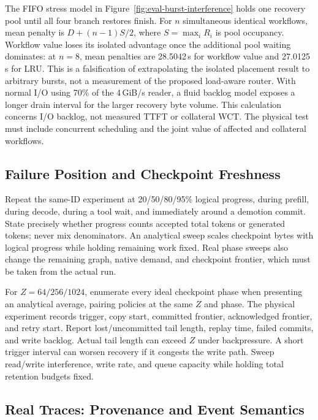 \documentclass[sigplan,10pt,anonymous,nonacm]{acmart}
\begin{document}
The FIFO stress model in Figure~\ref{fig:eval-burst-interference} holds
one recovery pool until all four branch restores finish. For $n$
simultaneous identical workflows, mean penalty is
$D+(n-1)S/2$, where $S=\max_i R_i$ is pool occupancy. Workflow value
loses its isolated advantage once the additional pool waiting dominates:
at $n=8$, mean penalties are 28.5042\,s for workflow value and
27.0125\,s for LRU. This is a falsification of extrapolating the
isolated placement result to arbitrary bursts, not a measurement of the
proposed load-aware router. With normal I/O using 70\% of the 4\,GiB/s reader, a fluid backlog model exposes a longer drain interval for the larger recovery byte volume. This calculation concerns I/O backlog, not measured TTFT or collateral WCT. The physical test must include concurrent scheduling and
the joint value of affected and collateral workflows.

\FloatBarrier
\subsection{Failure Position and Checkpoint Freshness}

Repeat the same-ID experiment at 20/50/80/95\% logical progress, during
prefill, during decode, during a tool wait, and immediately around a
demotion commit. State precisely whether progress counts accepted total
tokens or generated tokens; never mix denominators. An analytical sweep scales checkpoint bytes with logical progress while holding remaining work fixed.
Real phase sweeps also change the remaining graph, native demand, and
checkpoint frontier, which must be taken from the actual run.

For $Z=64/256/1024$, enumerate every ideal checkpoint phase when presenting
an analytical average, pairing policies at the same $Z$ and phase.
The physical experiment records trigger, copy start, committed frontier,
acknowledged frontier, and retry start. Report lost/uncommitted tail
length, replay time, failed commits, and write backlog. Actual tail length
can exceed $Z$ under backpressure. A short trigger interval can worsen
recovery if it congests the write path. Sweep read/write interference,
write rate, and queue capacity while holding total retention budgets fixed.

\FloatBarrier
\subsection{Real Traces: Provenance and Event Semantics}
\end{document}
